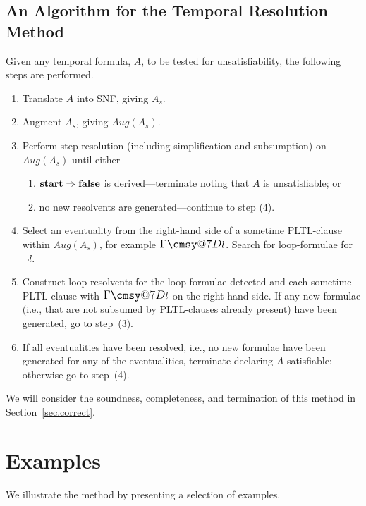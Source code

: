 \documentclass[nohyperref]{acmtrans2f}
\makeatletter
\def\sometime{\mathord{\hbox{\large$\mathchar"0\cmsy@7D$}}}
\let\imp=\Rightarrow
\def\lfalse{\hbox{\rm\bf false}}
\def\lstart{\hbox{\rm\bf start}}
\makeatother
\begin{document}
\subsection{An Algorithm for the Temporal Resolution Method}
\label{alg.full.tr}
%
Given any temporal formula, $A$, to be tested for unsatisfiability,
the following steps are performed.
%
\begin{enumerate}
\item Translate $A$ into SNF, giving $A_s$.
\item Augment $A_s$, giving $Aug(A_s)$.
\item Perform step resolution (including simplification and subsumption)
      on  $Aug(A_s)$ until either 
 \begin{enumerate}
 \item $\lstart \imp \lfalse$ is derived---terminate noting that $A$ is unsatisfiable; or 
 \item no new resolvents are generated---continue to step (4).
 \end{enumerate}
\item Select an eventuality from the right-hand side of a sometime PLTL-clause
 within $Aug(A_s)$, for example $\sometime l$. Search for loop-formulae for
 $\neg l$.
\item 
Construct loop resolvents for the loop-formulae detected and each sometime
PLTL-clause with $\sometime l$ on the right-hand side.
If any new formulae
 (i.e., that are not subsumed by PLTL-clauses already present) have been
 generated, go to step~(3). 
\item If all eventualities have been resolved, i.e., no new formulae have
been generated for any of the eventualities, terminate declaring $A$
satisfiable; otherwise go to step~(4).
\end{enumerate}
%
We will consider the soundness, completeness, and termination of this method in
Section~\ref{sec.correct}. 
%
\section{Examples}
\label{sec.eg}
We illustrate the method by presenting a selection of examples.
\end{document}
